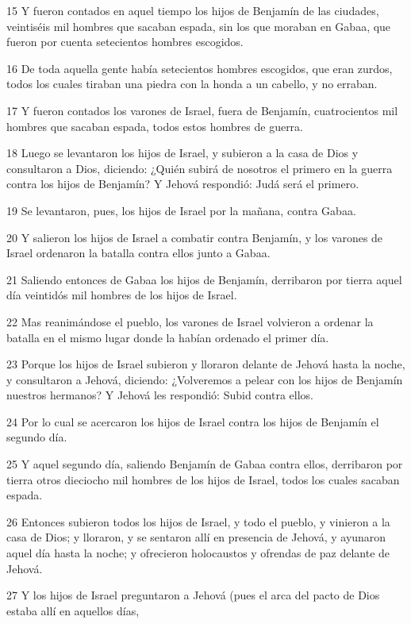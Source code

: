 \par 15 Y fueron contados en aquel tiempo los hijos de Benjamín de las ciudades, veintiséis mil hombres que sacaban espada, sin los que moraban en Gabaa, que fueron por cuenta setecientos hombres escogidos.
\par 16 De toda aquella gente había setecientos hombres escogidos, que eran zurdos, todos los cuales tiraban una piedra con la honda a un cabello, y no erraban.
\par 17 Y fueron contados los varones de Israel, fuera de Benjamín, cuatrocientos mil hombres que sacaban espada, todos estos hombres de guerra.
\par 18 Luego se levantaron los hijos de Israel, y subieron a la casa de Dios y consultaron a Dios, diciendo: ¿Quién subirá de nosotros el primero en la guerra contra los hijos de Benjamín? Y Jehová respondió: Judá será el primero.
\par 19 Se levantaron, pues, los hijos de Israel por la mañana, contra Gabaa.
\par 20 Y salieron los hijos de Israel a combatir contra Benjamín, y los varones de Israel ordenaron la batalla contra ellos junto a Gabaa.
\par 21 Saliendo entonces de Gabaa los hijos de Benjamín, derribaron por tierra aquel día veintidós mil hombres de los hijos de Israel.
\par 22 Mas reanimándose el pueblo, los varones de Israel volvieron a ordenar la batalla en el mismo lugar donde la habían ordenado el primer día.
\par 23 Porque los hijos de Israel subieron y lloraron delante de Jehová hasta la noche, y consultaron a Jehová, diciendo: ¿Volveremos a pelear con los hijos de Benjamín nuestros hermanos? Y Jehová les respondió: Subid contra ellos.
\par 24 Por lo cual se acercaron los hijos de Israel contra los hijos de Benjamín el segundo día.
\par 25 Y aquel segundo día, saliendo Benjamín de Gabaa contra ellos, derribaron por tierra otros dieciocho mil hombres de los hijos de Israel, todos los cuales sacaban espada.
\par 26 Entonces subieron todos los hijos de Israel, y todo el pueblo, y vinieron a la casa de Dios; y lloraron, y se sentaron allí en presencia de Jehová, y ayunaron aquel día hasta la noche; y ofrecieron holocaustos y ofrendas de paz delante de Jehová.
\par 27 Y los hijos de Israel preguntaron a Jehová (pues el arca del pacto de Dios estaba allí en aquellos días,
